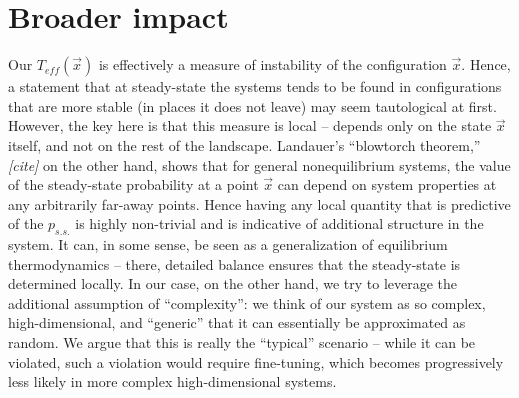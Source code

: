 \documentclass[11pt]{article}
\renewcommand{\v}[1]{\ensuremath{\vec{#1}}} %
\renewcommand{\=}[1]{\stackrel{#1}{=}} %
\renewcommand{\(}{\left (}
\renewcommand{\)}{\right  )}
\renewcommand{\[}{\left [}
\renewcommand{\]}{\right ]}
\newcommand{\<}{\left <}
\renewcommand{\>}{\right >}
\theoremstyle{definition}
\theoremstyle{remark}
\renewcommand{\todo}[1]{\textit{\color{red}[#1]}}
\begin{document}
\section{Broader impact}
Our $ T_{eff}(\v{x}) $ is effectively a measure of instability of the configuration $ \v{x} $. Hence, a statement that at steady-state the systems tends to be found in configurations that are more stable (in places it does not leave) may seem tautological at first. However, the key here is that this measure is local -- depends only on the state $ \v{x} $ itself, and not on the rest of the landscape. Landauer's ``blowtorch theorem,'' \todo{cite} on the other hand, shows that for general nonequilibrium systems, the value of the steady-state probability at a point $ \v{x} $ can depend on system properties at any arbitrarily far-away points. Hence having any local quantity that is predictive of the $ p_{s.s.} $ is highly non-trivial and is indicative of additional structure in the system. It can, in some sense, be seen as a generalization of equilibrium thermodynamics -- there, detailed balance ensures that the steady-state is determined locally. In our case, on the other hand, we try to leverage the additional assumption of ``complexity'': we think of our system as so complex, high-dimensional, and ``generic'' that it can essentially be approximated as random. We argue that this is really the ``typical'' scenario -- while it can be violated, such a violation would require fine-tuning, which becomes progressively less likely in more complex high-dimensional systems.
\end{document}

